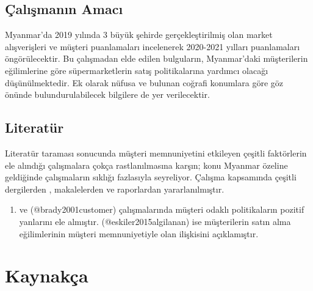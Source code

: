 \documentclass[
]{article}
\providecommand{\tightlist}{%
  \setlength{\itemsep}{0pt}\setlength{\parskip}{0pt}}
\newlength{\cslhangindent}
\newlength{\cslentryspacingunit} %
\newenvironment{CSLReferences}[2] %
 {%
  \setlength{\parindent}{0pt}
  \ifodd #1
  \let\oldpar\par
  \def\par{\hangindent=\cslhangindent\oldpar}
  \fi
  \setlength{\parskip}{#2\cslentryspacingunit}
 }%
 {}
\begin{document}
\hypertarget{uxe7alux131ux15fmanux131n-amacux131}{%
\subsection{Çalışmanın
Amacı}\label{uxe7alux131ux15fmanux131n-amacux131}}

Myanmar'da 2019 yılında 3 büyük şehirde gerçekleştirilmiş olan market
alışverişleri ve müşteri puanlamaları incelenerek 2020-2021 yılları
puanlamaları öngörülecektir. Bu çalışmadan elde edilen bulguların,
Myanmar'daki müşterilerin eğilimlerine göre süpermarketlerin satış
politikalarına yardımcı olacağı düşünülmektedir. Ek olarak nüfusa ve
bulunan coğrafi konumlara göre göz önünde bulundurulabilecek bilgilere
de yer verilecektir.

\hypertarget{literatuxfcr}{%
\subsection{Literatür}\label{literatuxfcr}}

Literatür taraması sonucunda müşteri memnuniyetini etkileyen çeşitli
faktörlerin ele alındığı çalışmalara çokça rastlanılmasına karşın; konu
Myanmar özeline geldiğinde çalışmaların sıklığı fazlasıyla seyreliyor.
Çalışma kapsamında çeşitli dergilerden , makalelerden ve raporlardan
yararlanılmıştır.

\begin{enumerate}
\def\labelenumi{(\arabic{enumi})}
\tightlist
\item
  ve (@brady2001customer) çalışmalarında müşteri odaklı politikaların
  pozitif yanlarını ele almıştır. (@eskiler2015algilanan) ise
  müşterilerin satın alma eğilimlerinin müşteri memnuniyetiyle olan
  ilişkisini açıklamıştır.
\end{enumerate}

\newpage

\hypertarget{references}{%
\section{Kaynakça}\label{references}}

\hypertarget{refs}{}
\begin{CSLReferences}{0}{0}
\end{CSLReferences}
\end{document}
